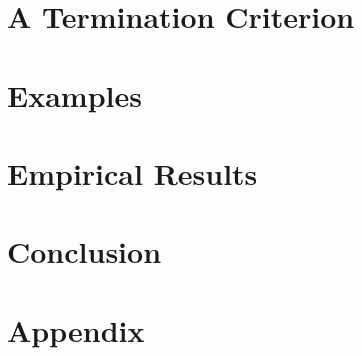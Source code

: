 
  
\section{A Termination Criterion} 
\label{antipattern:sec:termination_criterion}


\section{Examples}
\label{antipattern:sec:examples}


\section{Empirical Results}
\label{antipattern:sec:related_work} 


\section{Conclusion} 
\label{antipattern:sec:conclusion}
 

\newpage
\section{Appendix}
\label{antipattern:sec:appendix}


      